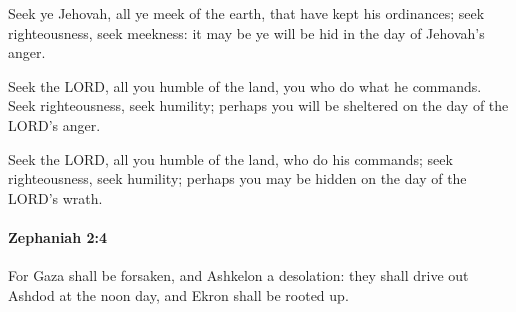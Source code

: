 			\begin{versebox}
					\item[BHS] 
					\item[LXX] 
					\item[ASV] Seek ye Jehovah, all ye meek of the earth, that have kept his ordinances; seek righteousness, seek meekness: it may be ye will be hid in the day of Jehovah's anger.
					\item[NIV] Seek the LORD, all you humble of the land, you who do what he commands. Seek righteousness, seek humility; perhaps you will be sheltered on the day of the LORD’s anger.
					\item[NRSV] Seek the LORD, all you humble of the land, who do his commands; seek righteousness, seek humility; perhaps you may be hidden on the day of the LORD’s wrath.
			\end{versebox}

		\paragraph{Zephaniah 2:4} %
			\label{ZEPHANIAH-2-4}

			For Gaza shall be forsaken, and Ashkelon a desolation: they shall drive out Ashdod at the noon day, and Ekron shall be rooted up.

